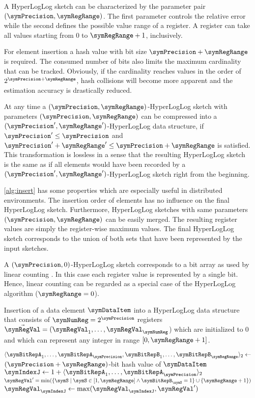 \documentclass[a4paper]{scrartcl}
\begin{document}
A HyperLogLog sketch can be characterized by the parameter pair $(\symPrecision, \symRegRange)$. The first parameter controls the relative error while the second defines the possible value range of a register. A register can take all values starting from 0 to $\symRegRange+1$, inclusively. 

For element insertion a hash value with bit size $\symPrecision+\symRegRange$ is required. The consumed number of bits also limits the maximum cardinality that can be tracked. Obviously, if the cardinality reaches values in the order of $2^{\symPrecision+\symRegRange}$, hash collisions will become more apparent and the estimation accuracy is drastically reduced.

At any time a $(\symPrecision, \symRegRange)$-HyperLogLog sketch with parameters $(\symPrecision, \symRegRange)$ can be compressed into a $(\symPrecision', \symRegRange')$-HyperLogLog data structure, if $\symPrecision'\leq\symPrecision$ and $\symPrecision'+\symRegRange' \leq\symPrecision + \symRegRange$ is satisfied. This transformation is lossless in a sense that the resulting HyperLogLog sketch is the same as if all elements would have been recorded by a $(\symPrecision', \symRegRange')$-HyperLogLog sketch right from the beginning.

\cref{alg:insert} has some properties which are especially useful in distributed environments. The insertion order of elements has no influence on the final HyperLogLog sketch. Furthermore, HyperLogLog sketches with same parameters $(\symPrecision, \symRegRange)$ can be easily merged. The resulting register values are simply the register-wise maximum values. The final HyperLogLog sketch corresponds to the union of both sets that have been represented by the input sketches. 

A $(\symPrecision, 0)$-HyperLogLog sketch corresponds to a bit array as used by linear counting \cite{Whang1990}. In this case each register value is represented by a single bit. Hence, linear counting can be regarded as a special case of the HyperLogLog algorithm ($\symRegRange = 0$).


\begin{algorithm}
\caption{Insertion of a data element $\symDataItem$ into a HyperLogLog data structure that consists of $\symNumReg=2^\symPrecision$ registers $\vec{\symRegVal} = (\symRegVal_1,\ldots,\symRegVal_\symNumReg$) which are initialized to 0 and which can represent any integer in range $[0, \symRegRange+1]$.}
\label{alg:insert}
\begin{algorithmic}
\State $\langle \symBitRepA_1, \ldots, \symBitRepA_\symPrecision,\symBitRepB_1,\ldots,\symBitRepB_\symRegRange\rangle_2 \gets$ $(\symPrecision + \symRegRange)$-bit hash value of $\symDataItem$
\State $\symIndexJ \gets 1+ \langle \symBitRepA_1, \ldots, \symBitRepA_\symPrecision\rangle_2$
\State $\symRegVal' = \min(\{\symS\mid \symS \in [1, \symRegRange]  \wedge  \symBitRepB_\symS = 1\}\cup {\{\symRegRange+1\}} )$
\State $\symRegVal_\symIndexJ \gets\max(\symRegVal_\symIndexJ, \symRegVal')$
\EndProcedure
\end{algorithmic}
\end{algorithm}
\end{document}
